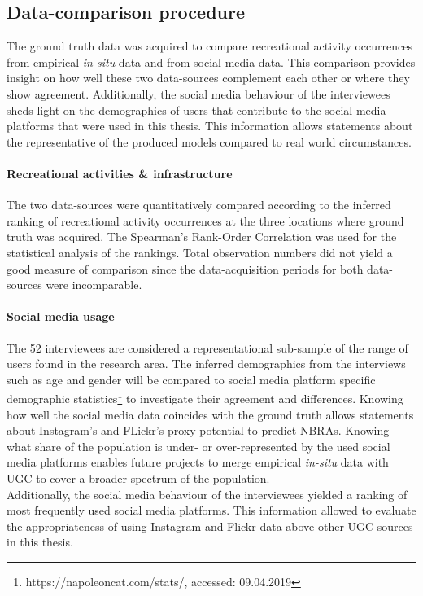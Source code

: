 \subsection{Data-comparison procedure}
The ground truth data was acquired to compare recreational activity occurrences from empirical \textit{in-situ} data and from social media data. This comparison provides insight on how well these two data-sources complement each other or where they show agreement. Additionally, the social media behaviour of the interviewees sheds light on the demographics of users that contribute to the social media platforms that were used in this thesis. This information allows statements about the representative of the produced models compared to real world circumstances.

\paragraph*{Recreational activities \& infrastructure}
The two data-sources were quantitatively compared according to the inferred ranking of recreational activity occurrences at the three locations where ground truth was acquired. The Spearman's Rank-Order Correlation was used for the statistical analysis of the rankings. Total observation numbers did not yield a good measure of comparison since the data-acquisition periods for both data-sources were incomparable. 

\paragraph*{Social media usage}
The 52 interviewees are considered a representational sub-sample of the range of users found in the research area. The inferred demographics from the interviews such as age and gender will be compared to social media platform specific demographic statistics\footnote{https://napoleoncat.com/stats/, accessed: 09.04.2019} to investigate their agreement and differences. Knowing how well the social media data coincides with the ground truth allows statements about Instagram's and FLickr's proxy potential to predict NBRAs. Knowing what share of the population is under- or over-represented by the used social media platforms enables future projects to merge empirical \textit{in-situ} data with UGC to cover a broader spectrum of the population.\\
Additionally, the social media behaviour of the interviewees yielded a ranking of most frequently used social media platforms. This information allowed to evaluate the appropriateness of using Instagram and Flickr data above other UGC-sources in this thesis.

